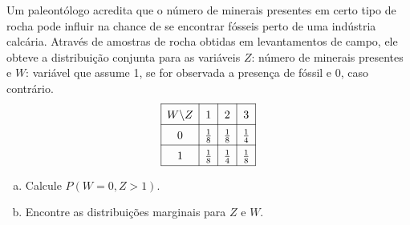 %
%


\begin{exercicioBanco}[\valorquestao]
    Um paleontólogo acredita que o número de minerais presentes em certo tipo de rocha pode influir na chance de se encontrar fósseis perto de uma indústria calcária. Através de amostras de rocha obtidas em levantamentos de campo, ele obteve a distribuição conjunta para as variáveis \(Z\): número de minerais presentes e \(W\): variável que assume 1, se for observada a presença de fóssil e 0, caso contrário.
    \[
    \renewcommand{\arraystretch}{1.5}
    \begin{array}{|c|c|c|c|}
        \hline
        W\backslash Z & 1 & 2 & 3 \\
        \hline
        0 & \frac{1}{8} & \frac{1}{8} & \frac{1}{4} \\
        \hline
        1 & \frac{1}{8} & \frac{1}{4} & \frac{1}{8} \\
        \hline
    \end{array}
    \]
    \begin{enumerate}[(a)]
        \item Calcule \(P(W = 0, Z > 1)\).
        \item Encontre as distribuições marginais para \(Z\) e \(W\).
    \end{enumerate}
\end{exercicioBanco}

